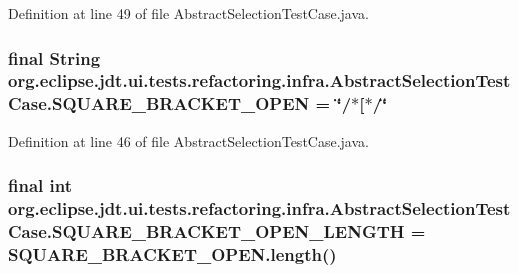 Definition at line 49 of file AbstractSelectionTestCase.java.

\hypertarget{classorg_1_1eclipse_1_1jdt_1_1ui_1_1tests_1_1refactoring_1_1infra_1_1AbstractSelectionTestCase_a8eb0547bed07d3a385682187b000924a}{
\subsubsection[{SQUARE\_\-BRACKET\_\-OPEN}]{\setlength{\rightskip}{0pt plus 5cm}final String {\bf org.eclipse.jdt.ui.tests.refactoring.infra.AbstractSelectionTestCase.SQUARE\_\-BRACKET\_\-OPEN} = \char`\"{}/$\ast$\mbox{[}$\ast$/\char`\"{}}}
\label{classorg_1_1eclipse_1_1jdt_1_1ui_1_1tests_1_1refactoring_1_1infra_1_1AbstractSelectionTestCase_a8eb0547bed07d3a385682187b000924a}


Definition at line 46 of file AbstractSelectionTestCase.java.

\hypertarget{classorg_1_1eclipse_1_1jdt_1_1ui_1_1tests_1_1refactoring_1_1infra_1_1AbstractSelectionTestCase_a1828ebda4e99645d7bee1fd31474b139}{
\subsubsection[{SQUARE\_\-BRACKET\_\-OPEN\_\-LENGTH}]{\setlength{\rightskip}{0pt plus 5cm}final int {\bf org.eclipse.jdt.ui.tests.refactoring.infra.AbstractSelectionTestCase.SQUARE\_\-BRACKET\_\-OPEN\_\-LENGTH} = SQUARE\_\-BRACKET\_\-OPEN.length()}}
\label{classorg_1_1eclipse_1_1jdt_1_1ui_1_1tests_1_1refactoring_1_1infra_1_1AbstractSelectionTestCase_a1828ebda4e99645d7bee1fd31474b139}


